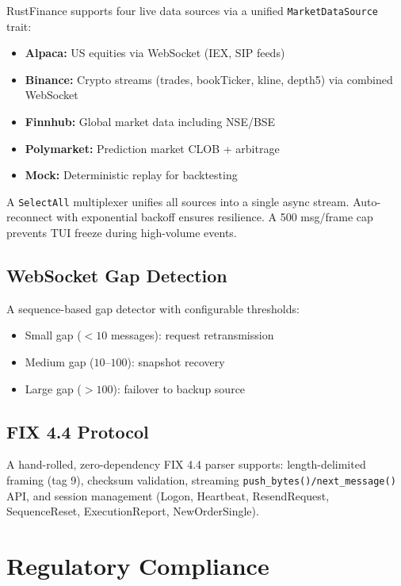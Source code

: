 \documentclass[11pt]{article}
\theoremstyle{definition}
\begin{document}
RustFinance supports four live data sources via a unified
\texttt{MarketDataSource} trait:
\begin{itemize}[leftmargin=*,topsep=2pt,itemsep=1pt]
  \item \textbf{Alpaca:} US equities via WebSocket (IEX, SIP feeds)
  \item \textbf{Binance:} Crypto streams (trades, bookTicker,
        kline, depth5) via combined WebSocket
  \item \textbf{Finnhub:} Global market data including NSE/BSE
  \item \textbf{Polymarket:} Prediction market CLOB + arbitrage
  \item \textbf{Mock:} Deterministic replay for backtesting
\end{itemize}

A \texttt{SelectAll} multiplexer unifies all sources into a
single async stream. Auto-reconnect with exponential backoff
ensures resilience. A 500 msg/frame cap prevents TUI freeze
during high-volume events.

\subsection{WebSocket Gap Detection}

A sequence-based gap detector with configurable thresholds:
\begin{itemize}[leftmargin=*,topsep=2pt,itemsep=1pt]
  \item Small gap ($< 10$ messages): request retransmission
  \item Medium gap ($10$--$100$): snapshot recovery
  \item Large gap ($> 100$): failover to backup source
\end{itemize}

\subsection{FIX 4.4 Protocol}

A hand-rolled, zero-dependency FIX 4.4 parser supports:
length-delimited framing (tag 9), checksum validation,
streaming \texttt{push\_bytes()/next\_message()} API,
and session management (Logon, Heartbeat, ResendRequest,
SequenceReset, ExecutionReport, NewOrderSingle).

\section{Regulatory Compliance}
\label{sec:compliance}
\end{document}
